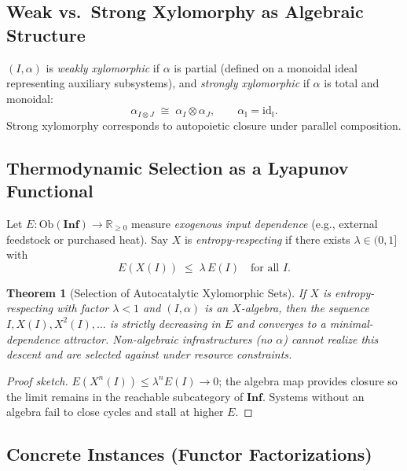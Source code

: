 \documentclass[12pt]{article}
\theoremstyle{plain}
\newtheorem{theorem}{Theorem}
\begin{document}
{{{{{{{{{{{{{{{{\subsection{Weak vs.\ Strong Xylomorphy as Algebraic Structure}

\begin{definition}
$(I,\alpha)$ is \emph{weakly xylomorphic} if $\alpha$ is partial (defined on a monoidal ideal representing auxiliary subsystems), and \emph{strongly xylomorphic} if $\alpha$ is total and monoidal:
\[
\alpha_{I\otimes J}\;\cong\; \alpha_I\otimes \alpha_J,\qquad \alpha_{\mathbb{I}}=\mathrm{id}_{\mathbb{I}}.
\]
Strong xylomorphy corresponds to autopoietic closure under parallel composition.
\end{definition}

\subsection{Thermodynamic Selection as a Lyapunov Functional}

Let $E:\mathrm{Ob}(\mathbf{Inf})\to \mathbb{R}_{\ge 0}$ measure \emph{exogenous input dependence} (e.g., external feedstock or purchased heat). Say $X$ is \emph{entropy-respecting} if there exists $\lambda\in(0,1]$ with
\[
E(X(I)) \;\le\; \lambda\,E(I)\quad\text{for all }I.
\]

\begin{theorem}[Selection of Autocatalytic Xylomorphic Sets]
\label{thm:selection}
If $X$ is entropy-respecting with factor $\lambda<1$ and $(I,\alpha)$ is an $X$-algebra, then the sequence $I, X(I), X^2(I),\dots$ is strictly decreasing in $E$ and converges to a minimal-dependence attractor. Non-algebraic infrastructures (no $\alpha$) cannot realize this descent and are selected against under resource constraints.
\end{theorem}

\begin{proof}[Proof sketch]
$E(X^n(I))\le \lambda^n E(I)\to 0$; the algebra map provides closure so the limit remains in the reachable subcategory of $\mathbf{Inf}$. Systems without an algebra fail to close cycles and stall at higher $E$.
\end{proof}

\subsection{Concrete Instances (Functor Factorizations)}

}}}}}}}}}}}}}}}}
\end{document}
